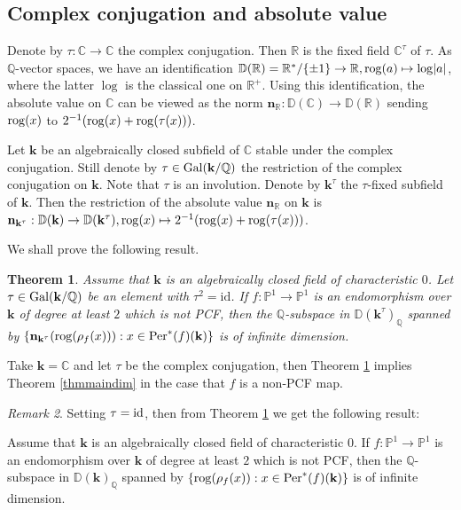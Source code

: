 \documentclass[12pt]{amsart}
\theoremstyle{plain}
\newtheorem{Thm}{Theorem}[section]
\theoremstyle{remark}
\newtheorem{Rem}[Thm]{Remark}
\theoremstyle{definition}
\def\Q{\mathbb Q}
\def\R{\mathbb R}
\def\C{\mathbb C}
\def\D{\mathbb D}
\def\P{\mathbb P}
\def\rog{{\rm rog}}
\begin{document}
\subsection{Complex conjugation and absolute value}Denote by $\tau: \C\to \C$ the complex conjugation. Then $\R$ is the fixed field $\C^{\tau}$ of $\tau$. As $\Q$-vector spaces, we have an identification $\D(\R)=\R^*/\{\pm 1\}\to \R,\rog (a)\mapsto\log \lvert a\rvert$, where the latter $\log$ is the classical one on $\R^+$. Using this identification, the absolute value on $\C$ can be viewed as the norm $\mathbf{n}_{\R}: \D(\C) \to\D(\R)$ sending $\rog (x)$ to $2^{-1}(\rog (x)+\rog (\tau(x)))$.\par 
Let $\mathbf{k}$ be an algebraically closed subfield of $\C$ stable under the complex conjugation. Still denote by $\tau \in{\rm Gal}(\mathbf{k}/\Q)$ the restriction of the complex conjugation on $\mathbf{k}$. Note that $\tau$ is an involution. Denote by $\mathbf{k}^{\tau}$ the $\tau$-fixed subfield of $\mathbf{k}$. Then the restriction of the absolute value $\mathbf{n}_{\R}$ on $\mathbf{k}$ is $\mathbf{n}_{\mathbf{k}^{\tau}}: \D(\mathbf{k}) \to \D(\mathbf{k}^{\tau}),\rog (x)\mapsto2^{-1}(\rog (x)+\rog (\tau(x)))$.\par
We shall prove the following result. 
\begin{Thm}\label{thminvo}
	Assume that $\mathbf{k}$ is an algebraically closed field of characteristic $0$. Let $\tau \in {\rm Gal}(\mathbf{k} / \Q)$ be an element with $\tau^{2}=\mathrm{id}$. If $f:\P^{1} \to \P^{1}$ is an endomorphism over $\mathbf{k}$ of degree at least $2$ which is not PCF, then the $\Q$-subspace in $\D(\mathbf{k}^{\tau})_{\Q}$ spanned by $\{\mathbf{n}_{\mathbf{k}^{\tau}}(\rog(\rho_f(x))) : x \in{\rm Per}^*(f)(\mathbf{k})\}$ is of infinite dimension.
\end{Thm}


Take $\mathbf{k}=\C$ and let $\tau$ be the complex conjugation, then Theorem \ref{thminvo} implies Theorem \ref{thmmaindim} in the case that $f$ is a non-PCF map.
\begin{Rem}
	Setting $\tau={\rm id}$, then from Theorem \ref{thminvo} we get the following result:\par 
	Assume that $\mathbf{k}$ is an algebraically closed field of characteristic $0$. If $f:\P^{1} \to \P^{1}$ is an endomorphism over $\mathbf{k}$ of degree at least $2$ which is not PCF, then the $\Q$-subspace in $\D(\mathbf{k})_{\Q}$ spanned by $\{\rog(\rho_f(x)) : x \in{\rm Per}^*(f)(\mathbf{k})\}$ is of infinite dimension.
\end{Rem}
\end{document}
